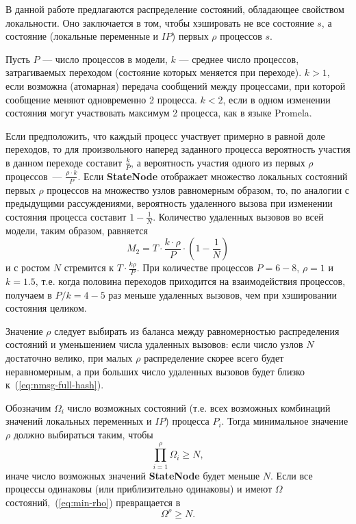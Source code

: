 \documentclass[12pt,a4paper,fleqn]{article}
\newcommand{\Code}[1]{\textbf{\mbox{#1}}}
\begin{document}
В данной работе предлагаются распределение состояний, обладающее свойством
локальности. Оно заключается в том, чтобы хэшировать не все состояние $s$, а состояние
(локальные переменные и $IP$) первых $\rho$ процессов $s$.

Пусть $P$ — число процессов в модели, $k$ — среднее число процессов, затрагиваемых
переходом (состояние которых меняется при переходе). $k > 1$, если возможна (атомарная)
передача сообщений между процессами, при которой сообщение меняют одновременно 2
процесса. $k < 2$, если в одном изменении состояния могут участвовать максимум 2 процесса,
как в языке Promela.

Если предположить, что каждый процесс участвует примерно в равной доле переходов, то для
произвольного наперед заданного процесса вероятность участия в данном переходе составит
$\frac{k}{P}$, а вероятность участия одного из первых $\rho$ процессов~--- $\frac{\rho\cdot
  k}{P}$. Если \Code{StateNode} отображает множество локальных состояний первых $\rho$
процессов на множество узлов равномерным образом, то, по аналогии с предыдущими
рассуждениями, вероятность удаленного вызова при изменении состояния процесса составит $1
- \frac{1}{N}$. Количество удаленных вызовов во всей модели, таким образом, равняется
\begin{equation}
  \label{eq:nmsg-firstproc-hash}
  M_2 = T \cdot \frac{k\cdot\rho}{P} \cdot (1 - \frac{1}{N})
\end{equation}
и с ростом $N$ стремится к $T \cdot \frac{k\rho}{P}$. При количестве процессов $P = 6-8$,
$\rho = 1$ и $k = 1.5$, т.е. когда половина переходов приходится на взаимодействия
процессов, получаем в $P/k = 4-5$ раз меньше удаленных вызовов, чем при хэшировании
состояния целиком.

Значение $\rho$ следует выбирать из баланса между равномерностью распределения состояний и
уменьшением числа удаленных вызовов: если число узлов $N$ достаточно велико, при малых
$\rho$ распределение скорее всего будет неравномерным, а при больших число удаленных
вызовов будет близко к~(\ref{eq:nmsg-full-hash}).

Обозначим $\Omega_i$ число возможных состояний (т.е. всех возможных комбинаций значений
локальных переменных и $IP$) процесса $P_i$. Тогда минимальное значение $\rho$ должно
выбираться таким, чтобы
\begin{equation}
  \label{eq:min-rho}
  \prod_{i = 1}^\rho{\Omega_i} \geq N,
\end{equation}
иначе число возможных значений \Code{StateNode} будет меньше $N$. Если все процессы
одинаковы (или приблизительно одинаковы) и имеют $\Omega$ состояний,~(\ref{eq:min-rho})
превращается в 
\begin{equation}
  \label{eq:min-rho-homo}
  \Omega^\rho \geq N.
\end{equation}
\end{document}
